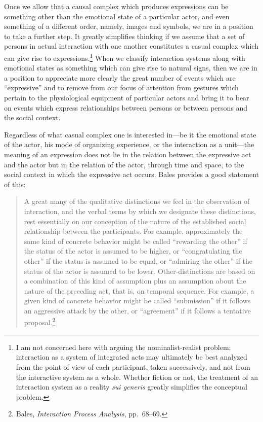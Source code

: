 \documentclass[openany,nobib]{tufte-book}
\begin{document}
Once we allow that a causal complex which produces expressions can be
something other than the emotional state of a particular actor, and even
something of a different order, namely, images and symbols, we are in a
position to take a further step. It greatly simplifies thinking if we
assume that a set of persons in actual interaction with one another
constitutes a casual complex which can give rise to
expressions.\footnote{I am not concerned here with arguing the
  nominalist-realist problem; interaction as a system of integrated acts
  may ultimately be best analyzed from the point of view of each
  participant, taken successively, and not from the interactive system
  as a whole. Whether fiction or not, the treatment of an interaction
  system as a reality \emph{sui generis} greatly simplifies the
  conceptual problem.} When we classify interaction systems along with
emotional states as something which can give rise to natural signs, then
we are in a position to appreciate more clearly the great number of
events which are ``expressive'' and to remove from our focus of
attention from gestures which pertain to the physiological equipment of
particular actors and bring it to bear on events which express
relationships between persons or between persons and the social context.

Regardless of what casual complex one is interested in---be it the
emotional state of the actor, his mode of organizing experience, or the
interaction as a unit---the meaning of an expression does not lie in the
relation between the expressive act and the actor but in the relation of
the actor, through time and space, to the social context in which the
expressive act occurs. Bales provides a good statement of this:

\begin{quote}
A great many of the qualitative distinctions we feel in the observation
of interaction, and the verbal terms by which we designate these
distinctions, rest essentially on our conception of the nature of the
established social relationship between the participants. For example,
approximately the same kind of concrete behavior might be called
``rewarding the other'' if the status of the actor is assumed to be
higher, or ``congratulating the other'' if the status is assumed to be
equal, or ``admiring the other'' if the status of the actor is assumed
to be lower. Other-distinctions are based on a combination of this kind
of assumption plus an assumption about the nature of the preceding act,
that is, on temporal sequence. For example, a given kind of concrete
behavior might be called ``submission'' if it follows an aggressive
attack by the other, or ``agreement'' if it follows a tentative
proposal.\footnote{Bales, \emph{Interaction Process Analysis},
  pp.~68--69.}
\end{quote}
\end{document}
